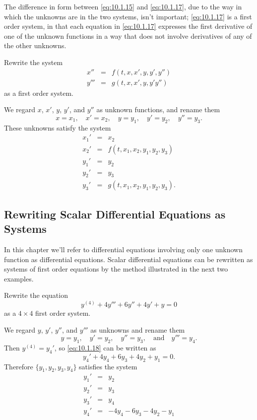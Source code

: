 \documentclass{ximera}
\begin{document}
\begin{remark} The difference in form between \eqref{eq:10.1.15} and
\eqref{eq:10.1.17}, due to the way in which the unknowns are 
in the two systems, isn't  important;     \eqref{eq:10.1.17} is a first
order system, in that each equation in \eqref{eq:10.1.17} expresses the
first derivative of one of the unknown functions in a way that does
not involve derivatives of any of the other unknowns.
\end{remark}

\begin{example}\label{example:10.1.5}
 Rewrite the system
$$
\begin{array}{ccc} x''&=&f(t,x,x',y,y',y'')\\
y'''&=&g(t,x,x',y,y'y'')
\end{array}
$$
 as a first order system.


\begin{explanation}
We regard $x$, $x'$, $y$, $y'$, and $y''$ as unknown functions, and
rename them
$$
x=x_1,\quad x'=x_2,\quad y=y_1,\quad y'=y_2,\quad y''=y_3.
$$
These unknowns satisfy the system
$$
\begin{array}{ccl} 
x_1'&=&x_2\\
x_2'&=&f(t,x_1,x_2,y_1,y_2,y_3)\\
y_1'&=&y_2\\
y_2'&=&y_3\\
y_3'&=&g(t,x_1,x_2,y_1,y_2,y_3).\end{array}
$$
\end{explanation}
\end{example}

\subsection*{Rewriting Scalar Differential Equations as Systems}

In this chapter we'll refer to differential equations involving only
one unknown function as  differential equations. Scalar
differential equations can be rewritten as systems of first order
equations by the method illustrated in the next two examples.

\begin{example}\label{example:10.1.6}
Rewrite the equation
\begin{equation} \label{eq:10.1.18}
y^{(4)}+4y'''+6y''+4y'+y=0
\end{equation}
as a $4\times4$ first order system.

\begin{explanation}
We regard $y$, $y'$, $y''$, and $y'''$  as unknowns and rename them
$$
y=y_1,\quad y'=y_2,\quad y''=y_3,\quad\mbox{and}\quad y'''=y_4.
$$
Then $y^{(4)}=y_4'$, so \eqref{eq:10.1.18} can be written as
$$
y_4'+4y_4+6y_3+4y_2+y_1=0.
$$
Therefore $\{y_1,y_2,y_3,y_4\}$ satisfies the system
 \begin{eqnarray*}
y_1'&=&y_2\\
y_2'&=&y_3 \\
y_3'&=&y_4\\
y_4'&=&-4y_4-6y_3-4y_2-y_1
\end{eqnarray*}
\end{explanation}
\end{example}
\end{document}
